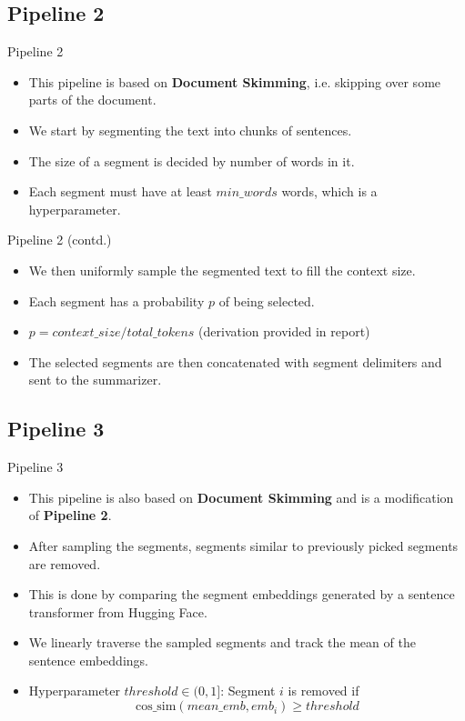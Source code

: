 \subsection{Pipeline 2}

\begin{frame}{Pipeline 2}
	
	\begin{itemize}
		\item This pipeline is based on \textbf{Document Skimming}, i.e. skipping over some parts
		of the document.
		\item<2-> We start by segmenting the text into chunks of sentences.
		\item<3-> The size of a segment is decided by number of words in it.
		\item<4-> Each segment must have at least $min\_words$ words, which is a
		hyperparameter.
	\end{itemize}

\end{frame}

\begin{frame}{Pipeline 2 (contd.)}
	
	\begin{itemize}
		\item We then uniformly sample the segmented text to fill the context size.
		\item<2-> Each segment has a probability $p$ of being selected.
		\item<3-> $ p = context\_size / total\_tokens $
		(derivation provided in report)
		\item<4-> The selected segments are then concatenated with segment delimiters
		and sent to the summarizer.
	\end{itemize}

\end{frame}


\subsection{Pipeline 3}

\begin{frame}{Pipeline 3}

	\begin{itemize}
		\item This pipeline is also based on \textbf{Document Skimming} and is a modification
		of \textbf{Pipeline 2}.
		\item<2-> After sampling the segments, segments similar to previously picked
		segments are removed.
		\item<3-> This is done by comparing the segment embeddings generated by
		a sentence transformer from Hugging Face.
		\item<4-> We linearly traverse the sampled segments and track the mean of the
		sentence embeddings.
		\item<5> Hyperparameter $threshold \in (0, 1]$: Segment $i$ is removed if
		\[ \mathrm{cos\_sim}(mean\_emb, emb_i) \ge threshold \]
	\end{itemize}

\end{frame}


